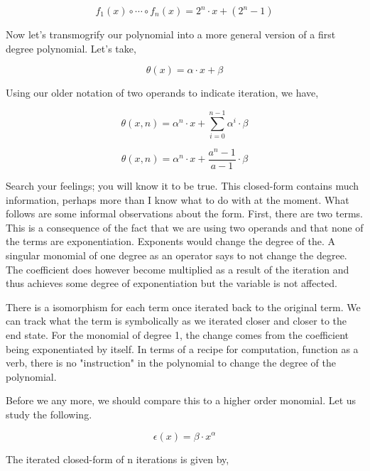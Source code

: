 \begin{equation}
    f_1(x) \circ \cdots \circ f_n(x) =  2^n \cdot x + (2^n - 1)
\end{equation}

Now let's transmogrify our polynomial into a more general version of a first
degree polynomial. Let's take,

\begin{equation}
    \theta(x) = \alpha \cdot x + \beta
\end{equation}

Using our older notation of two operands to indicate iteration, we have,

\begin{equation}
    \theta(x,n) = \alpha^n \cdot x + \sum_{i=0}^{n-1} \alpha^i \cdot \beta
\end{equation}

\begin{equation}
    \theta(x,n) = \alpha^n \cdot x + \frac{a^n-1}{a-1} \cdot \beta
\end{equation}

Search your feelings; you will know it to be true. This closed-form contains
much information, perhaps more than I know what to do with at the moment. What
follows are some informal observations about the form. First, there are two
terms. This is a consequence of the fact that we are using two operands and
that none of the terms are exponentiation. Exponents would change the degree of
the. A singular monomial of one degree as an operator says to not change the
degree. The coefficient does however become multiplied as a result of the
iteration and thus achieves some degree of exponentiation but the variable is
not affected.

There is a isomorphism for each term once iterated back to the original term.
We can track what the term is symbolically as we iterated closer and closer to
the end state. For the monomial of degree 1, the change comes from the
coefficient being exponentiated by itself. In terms of a recipe for
computation, function as a verb, there is no "instruction" in the polynomial to
change the degree of the polynomial.

Before we any more, we should compare this to a higher order monomial. Let us
study the following.

\begin{equation}
    \epsilon(x) = \beta \cdot x^\alpha
\end{equation}

The iterated closed-form of n iterations is given by,

